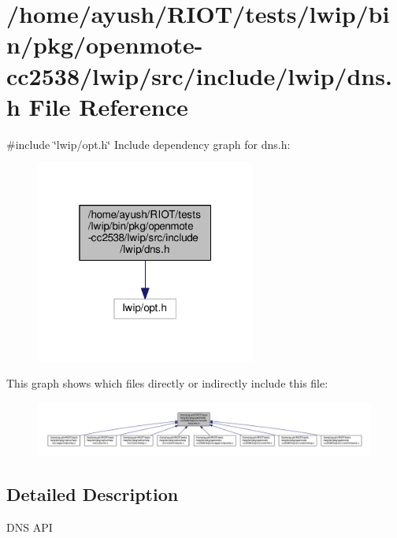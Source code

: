 \hypertarget{openmote-cc2538_2lwip_2src_2include_2lwip_2dns_8h}{}\section{/home/ayush/\+R\+I\+O\+T/tests/lwip/bin/pkg/openmote-\/cc2538/lwip/src/include/lwip/dns.h File Reference}
\label{openmote-cc2538_2lwip_2src_2include_2lwip_2dns_8h}
{\ttfamily \#include \char`\"{}lwip/opt.\+h\char`\"{}}\newline
Include dependency graph for dns.\+h\+:
\nopagebreak
\begin{figure}[H]
\begin{center}
\leavevmode
\includegraphics[width=205pt]{openmote-cc2538_2lwip_2src_2include_2lwip_2dns_8h__incl}
\end{center}
\end{figure}
This graph shows which files directly or indirectly include this file\+:
\nopagebreak
\begin{figure}[H]
\begin{center}
\leavevmode
\includegraphics[width=350pt]{openmote-cc2538_2lwip_2src_2include_2lwip_2dns_8h__dep__incl}
\end{center}
\end{figure}


\subsection{Detailed Description}
D\+NS A\+PI 